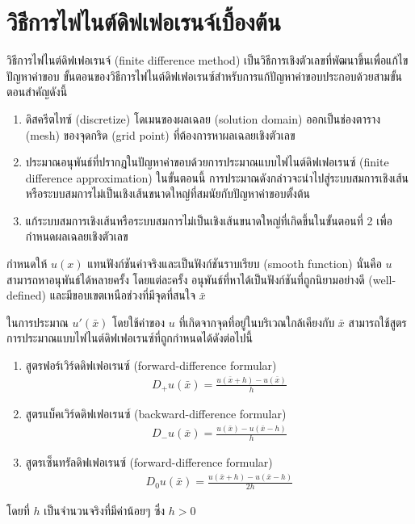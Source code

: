 \section{วิธีการไฟไนต์ดิฟเฟอเรนจ์เบื้องต้น}
\hspace{1cm} วิธีการไฟไนต์ดิฟเฟอเรนจ์ (finite difference method)  เป็นวิธีการเชิงตัวเลขที่พัฒนาขึ้นเพื่อแก้ไขปัญหาค่าขอบ ขั้นตอนของวิธีการไฟไนต์ดิฟเฟอเรนซ์สำหรับการแก้ปัญหาค่าขอบประกอบด้วยสามขั้นตอนสำคัญดังนี้

\begin{enumerate}
    \item ดิสครีตไทซ์ (discretize) โดเมนของผลเฉลย (solution domain) ออกเป็นช่องตาราง (mesh) ของจุดกริด (grid point) ที่ต้องการหาผลเฉลยเชิงตัวเลข
    \item ประมาณอนุพันธ์ที่ปรากฏในปัญหาค่าขอบด้วยการประมาณแบบไฟไนต์ดิฟเฟอเรนซ์ (finite difference approximation) ในขั้นตอนนี้ การประมาณดังกล่าวจะนำไปสู่ระบบสมการเชิงเส้น หรือระบบสมการไม่เป็นเชิงเส้นขนาดใหญ่ที่สมนัยกับปัญหาค่าขอบตั้งต้น
    \item แก้ระบบสมการเชิงเส้นหรือระบบสมการไม่เป็นเชิงเส้นขนาดใหญ่ที่เกิดขึ้นในขั้นตอนที่ 2 เพื่อกำหนดผลเฉลยเชิงตัวเลข
\end{enumerate}

\hspace{1cm} กำหนดให้ $u(x)$ แทนฟังก์ชันค่าจริงและเป็นฟังก์ชันราบเรียบ (smooth function) นั่นคือ $u$ สามารถหาอนุพันธ์ได้หลายครั้ง โดยแต่ละครั้ง อนุพันธ์ที่หาได้เป็นฟังก์ชันที่ถูกนิยามอย่างดี (well-defined) และมีขอบเขตเหนือช่วงที่มีจุดที่สนใจ $\bar{x}$

\hspace{1cm} ในการประมาณ $u'(\bar{x})$ โดยใช้ค่าของ $u$ ที่เกิดจากจุดที่อยู่ในบริเวณใกล้เคียงกับ $\bar{x}$ สามารถใช้สูตรการประมาณแบบไฟไนต์ดิฟเฟอเรนซ์ที่ถูกกำหนดได้ดังต่อไปนี้
\begin{enumerate}
    \item สูตรฟอร์เวิร์ดดิฟเฟอเรนซ์ (forward-difference formular) 
    \begin{align*}
        D_{+}u(\bar{x}) = \frac{u(\bar{x}+h) - u(\bar{x})}{h}    
    \end{align*}
    \item สูตรแบ็คเวิร์ดดิฟเฟอเรนซ์ (backward-difference formular) 
    \begin{align*}
        D_{-}u(\bar{x}) = \frac{u(\bar{x}) - u(\bar{x}-h)}{h}    
    \end{align*}
    \item สูตรเซ็นทรัลดิฟเฟอเรนซ์ (forward-difference formular) 
    \begin{align*}
        D_{0}u(\bar{x}) = \frac{u(\bar{x}+h) - u(\bar{x}-h)}{2h}    
    \end{align*}
\end{enumerate}
โดยที่ $h$ เป็นจำนวนจริงที่มีค่าน้อยๆ ซึ่ง $h>0$ 

